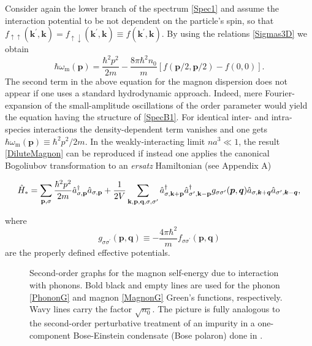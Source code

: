 \documentclass[reprint,superscriptaddress,showpacs,nofootinbib,aps,pra]{revtex4-1}
\begin{document}
Consider again the lower branch of the spectrum \eqref{Spec1} and assume the interaction potential to be not dependent on the particle's spin, so that $f_{\uparrow\uparrow}(\bm k^\prime,\bm k)=f_{\uparrow\downarrow}(\bm k^\prime,\bm k)\equiv f(\bm k^\prime,\bm k)$. By using the relations \eqref{Sigmas3D} we obtain
\begin{equation}
\label{DiluteMagnon}
\hbar\omega_\mathrm{m}(\bm p)=\frac{\hbar^2 p^2}{2m}-\frac{8\pi\hbar^2 n_0}{m}[f(\bm p/2,\bm p/2)-f(0,0)].
\end{equation}
The second term in the above equation for the magnon dispersion does not appear if one uses a standard hydrodynamic approach. Indeed, mere Fourier-expansion of the small-amplitude oscillations of the order parameter would yield the equation having the structure of \eqref{SpecB1}. For identical inter- and intra-species interactions the density-dependent term vanishes and one gets $\hbar\omega_{\mathrm m}(\bm p)\equiv \hbar^2 p^2/2m$. In the weakly-interacting limit $n a^3\ll 1$, the result \eqref{DiluteMagnon} can be reproduced if instead one applies the canonical Bogoliubov transformation to an \textit{ersatz} Hamiltonian (see Appendix A)
\begin{widetext}
\begin{equation}
\label{DiluteHamiltonian}
\hat H_\ast=\sum_{\textbf{p},\sigma}\frac{\hbar^2 p^2}{2m}\hat a_{\sigma, \textbf{p}}^{\dag} \hat a_{\sigma, \textbf{p}}+\frac{1}{2V}\sum_{\textbf k,\textbf p,\textbf q,\sigma,\sigma^\prime}\hat a_{\sigma, \textbf k+\textbf p}^{\dag} \hat a_{\sigma^\prime,\textbf k-\textbf p}^{\dag} g_{\sigma\sigma^\prime}(\bm p, \bm q)\hat a_{\sigma, \bm k+\bm q}\hat a_{\sigma^\prime,\bm k-\bm q},
\end{equation}
\end{widetext}
where
\begin{equation}
g_{\sigma\sigma^\prime}(\bm p, \bm q)\equiv-\frac{4\pi\hbar^2}{m} f_{\sigma\sigma^\prime}(\bm p, \bm q)
\end{equation}
are the properly defined effective potentials.
\begin{figure*}[t]
  \noindent{}
  \caption{Second-order graphs for the magnon self-energy due to interaction with phonons. Bold black and empty lines are used for the phonon \eqref{PhononG} and magnon \eqref{MagnonG} Green's functions, respectively. Wavy lines carry the factor $\sqrt{n_0}$. The picture is fully analogous to the second-order perturbative treatment of an impurity in a one-component Bose-Einstein condensate (Bose polaron) done in \cite{Christensen}.}    
  \label{Polaron}
\end{figure*}    
  
\end{document}
